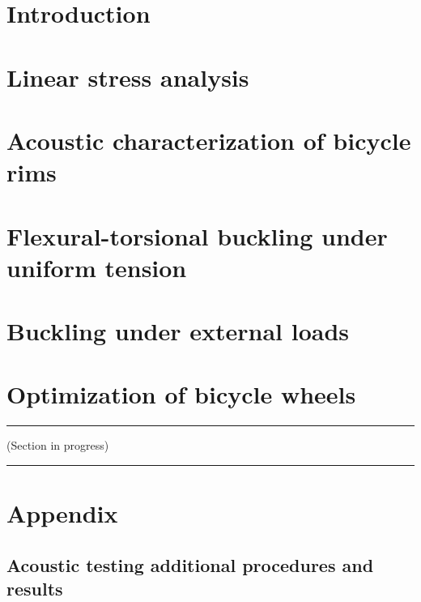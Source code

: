 \documentclass{nuthesis}
\newcommand{\inprogress}{
\begin{center}
{
\color{red}
\noindent\rule{\textwidth}{1pt}
\Large (Section in progress)
\noindent\rule{\textwidth}{1pt}
}
\end{center}
}
\begin{document}
\tableofcontents


\chapter{Introduction}
\label{chap:introduction}



\chapter{Linear stress analysis}
\label{chap:stress_analysis}



\chapter{Acoustic characterization of bicycle rims}
\label{chap:acoustic_testing}



\chapter{Flexural-torsional buckling under uniform tension}
\label{chap:tension_buckling}



\chapter{Buckling under external loads}
\label{chap:buckling_ext_loads}



\chapter{Optimization of bicycle wheels}
\label{chap:optimization}
\inprogress





\appendix

\chapter{Appendix}
\label{sec:appendix}

\section{Acoustic testing additional procedures and results}
\label{app:acoustic_testing}

\end{document}
